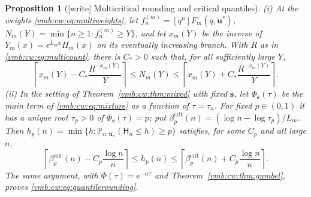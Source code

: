 \documentclass[11pt,a4paper]{article}
\numberwithin{equation}{section}
\newtheorem{proposition}[theorem]{Proposition}
\theoremstyle{definition}\newtheorem{definition}[theorem]{Definition}
\theoremstyle{remark}\newtheorem{remark}[theorem]{Remark}
\newcommand{\Prob}{\mathbb P}
\newcommand{\coeff}[2]{[#1^{#2}]}
\begin{document}
\begin{proposition}[{[write]} Multicritical rounding and critical quantiles]
\label{vmb:cw:prop:roundingmulti}
\textup{(i)} At the weights \eqref{vmb:cw:eq:multiweights}, let
$f^{(m)}_n=\coeff qn F_m(q,\bm u^*)$, $N_m(Y)=\min\{n\ge1:f^{(m)}_n\ge Y\}$,
and let $x_m(Y)$ be the inverse of $Y_m(x)=e^{L_mx}\Pi_m(x)$ on its
eventually increasing branch. With $R$ as in \eqref{vmb:cw:eq:multicount},
there is $C_*>0$ such that, for all sufficiently large $Y$,
\[
 \left\lceil x_m(Y)-C_*\frac{R^{-x_m(Y)}}Y\right\rceil
 \le N_m(Y)\le
 \left\lceil x_m(Y)+C_*\frac{R^{-x_m(Y)}}Y\right\rceil.
\]
\textup{(ii)} In the setting of Theorem~\ref{vmb:cw:thm:mixed} with fixed
$\bm s$, let $\Phi_{\bm s}(\tau)$ be the main term of
\eqref{vmb:cw:eq:mixture} as a function of $\tau=\tau_n$. For fixed
$p\in(0,1)$ it has a unique root $\tau_p>0$ of $\Phi_{\bm s}(\tau)=p$; put
$\beta^{\mathrm{crit}}_p(n)=(\log n-\log\tau_p)/L_m$. Then
$h_p(n)=\min\{h:\Prob_{n,\bm u_n}(\mathsf H_n\le h)\ge p\}$ satisfies, for
some $C_p$ and all large $n$,
\[
 \left\lceil \beta^{\mathrm{crit}}_p(n)-C_p\frac{\log n}{n}\right\rceil
 \le h_p(n)\le
 \left\lceil \beta^{\mathrm{crit}}_p(n)+C_p\frac{\log n}{n}\right\rceil.
\]
The same argument, with $\Phi(\tau)=e^{-\alpha\tau}$ and
Theorem~\ref{vmb:cw:thm:gumbel}, proves \eqref{vmb:cw:eq:quantilerounding}.
\end{proposition}
\end{document}
